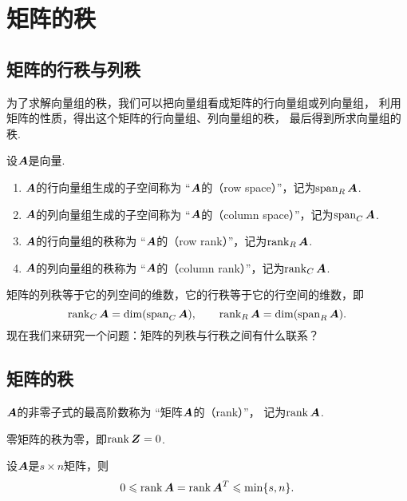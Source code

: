 \section{矩阵的秩}
\subsection{矩阵的行秩与列秩}
为了求解向量组的秩，我们可以把向量组看成矩阵的行向量组或列向量组，
利用矩阵的性质，得出这个矩阵的行向量组、列向量组的秩，
最后得到所求向量组的秩.

\begin{definition}\label{definition:线性方程组.行秩与列秩的定义}
设\(\boldsymbol{A}\)是向量.
\begin{enumerate}
	\item \(\boldsymbol{A}\)的行向量组生成的子空间称为
	“\(\boldsymbol{A}\)的（row space）”，记为\(\operatorname{span}_R\boldsymbol{A}\).
	\item \(\boldsymbol{A}\)的列向量组生成的子空间称为
	“\(\boldsymbol{A}\)的（column space）”，记为\(\operatorname{span}_C\boldsymbol{A}\).
	\item \(\boldsymbol{A}\)的行向量组的秩称为
	“\(\boldsymbol{A}\)的（row rank）”，记为\(\rank_R\boldsymbol{A}\).
	\item \(\boldsymbol{A}\)的列向量组的秩称为
	“\(\boldsymbol{A}\)的（column rank）”，记为\(\rank_C\boldsymbol{A}\).
\end{enumerate}
\end{definition}

矩阵的列秩等于它的列空间的维数，它的行秩等于它的行空间的维数，即\[
	\rank_C\boldsymbol{A}=\dim(\operatorname{span}_C\boldsymbol{A}), \qquad
	\rank_R\boldsymbol{A}=\dim(\operatorname{span}_R\boldsymbol{A}).
\]
现在我们来研究一个问题：矩阵的列秩与行秩之间有什么联系？

\subsection{矩阵的秩}
\begin{definition}\label{definition:线性方程组.矩阵的秩的定义}
\(\boldsymbol{A}\)的非零子式的最高阶数称为
“矩阵\(\boldsymbol{A}\)的（rank）”，
记为\(\rank\boldsymbol{A}\).
\end{definition}

\begin{property}\label{theorem:线性方程组.矩阵的秩的性质1}
零矩阵的秩为零，即\(\rank\boldsymbol{Z} = 0\).
\end{property}

\begin{property}\label{theorem:线性方程组.矩阵的秩的性质2}
设\(\boldsymbol{A}\)是\(s \times n\)矩阵，则\[
	0 \leqslant \rank\boldsymbol{A} = \rank\boldsymbol{A}^T \leqslant \min\{s,n\}.
\]
\end{property}

